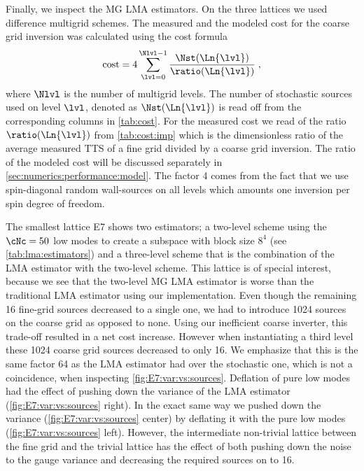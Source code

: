 Finally, we inspect the MG LMA estimators.
On the three lattices we used difference multigrid schemes.
The measured and the modeled cost for the coarse grid inversion was calculated using the cost formula
\begin{equation} \label{eq:numerics:cost}
\text{cost} = 4 \sum_{\lvl = 0}^{\Nlvl -1} \frac{\Nst(\Ln{\lvl})}{\ratio(\Ln{\lvl})} \;,
\end{equation}
where $\Nlvl$ is the number of multigrid levels.
The number of stochastic sources used on level $\lvl$, denoted as $\Nst(\Ln{\lvl})$ is read off from the corresponding columns in \cref{tab:cost}.
For the measured cost we read of the ratio $\ratio(\Ln{\lvl})$ from \cref{tab:cost:imp} which is the dimensionless ratio of the average measured TTS of a fine grid divided by a coarse grid inversion.
The ratio of the modeled cost will be discussed separately in \cref{sec:numerics:performance:model}.
The factor \num{4} comes from the fact that we use spin-diagonal random wall-sources on all levels which amounts one inversion per spin degree of freedom.

The smallest lattice E7 shows two estimators; a two-level scheme using the $\cNc=50$ low modes to create a subspace with block size $8^4$ (see \cref{tab:lma:estimators}) and a three-level scheme that is the combination of the LMA estimator with the two-level scheme.
This lattice is of special interest, because we see that the two-level MG LMA estimator is worse than the traditional LMA estimator using our implementation.
Even though the remaining \num{16} fine-grid sources decreased to a single one, we had to introduce \num{1024} sources on the coarse grid as opposed to none.
Using our inefficient coarse inverter, this trade-off resulted in a net cost increase.
However when instantiating a third level these \num{1024} coarse grid sources decreased to only \num{16}.
We emphasize that this is the same factor \num{64} as the LMA estimator had over the stochastic one, which is not a coincidence, when inspecting \cref{fig:E7:var:vs:sources}.
Deflation of pure low modes had the effect of pushing down the  variance of the LMA estimator (\cref{fig:E7:var:vs:sources} right).
In the exact same way we pushed down the  variance (\cref{fig:E7:var:vs:sources} center) by deflating it with the pure low modes (\cref{fig:E7:var:vs:sources} left).
However, the intermediate non-trivial lattice between the fine grid and the trivial lattice has the effect of both pushing down the  noise to the gauge variance and decreasing the required sources on  to \num{16}.


